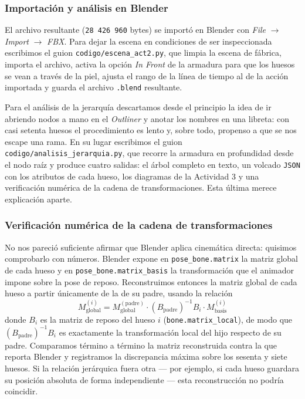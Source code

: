 \subsubsection{Importación y análisis en Blender}
El archivo resultante (\texttt{28\,426\,960} bytes) se importó en Blender con \textit{File} $\to$ \textit{Import} $\to$ \textit{FBX}. Para dejar la escena en condiciones de ser inspeccionada escribimos el guion \texttt{codigo/escena\_act2.py}, que limpia la escena de fábrica, importa el archivo, activa la opción \textit{In Front} de la armadura para que los huesos se vean a través de la piel, ajusta el rango de la línea de tiempo al de la acción importada y guarda el archivo \texttt{.blend} resultante.

Para el análisis de la jerarquía descartamos desde el principio la idea de ir abriendo nodos a mano en el \textit{Outliner} y anotar los nombres en una libreta: con casi setenta huesos el procedimiento es lento y, sobre todo, propenso a que se nos escape una rama. En su lugar escribimos el guion \texttt{codigo/analisis\_jerarquia.py}, que recorre la armadura en profundidad desde el nodo raíz y produce cuatro salidas: el árbol completo en texto, un volcado \texttt{JSON} con los atributos de cada hueso, los diagramas de la Actividad 3 y una verificación numérica de la cadena de transformaciones. Esta última merece explicación aparte.

\subsubsection{Verificación numérica de la cadena de transformaciones}
No nos pareció suficiente afirmar que Blender aplica cinemática directa: quisimos comprobarlo con números. Blender expone en \texttt{pose\_bone.matrix} la matriz global de cada hueso y en \texttt{pose\_bone.matrix\_basis} la transformación que el animador impone sobre la pose de reposo. Reconstruimos entonces la matriz global de cada hueso a partir únicamente de la de su padre, usando la relación
\begin{equation}
    M_{\text{global}}^{(i)} = M_{\text{global}}^{(\text{padre})} \cdot
    \left(B_{\text{padre}}\right)^{-1} B_i \cdot M_{\text{basis}}^{(i)}
    \label{eq:reconstruccion}
\end{equation}
donde $B_i$ es la matriz de reposo del hueso $i$ (\texttt{bone.matrix\_local}), de modo que $\left(B_{\text{padre}}\right)^{-1} B_i$ es exactamente la transformación local del hijo respecto de su padre. Comparamos término a término la matriz reconstruida contra la que reporta Blender y registramos la discrepancia máxima sobre los sesenta y siete huesos. Si la relación jerárquica fuera otra --- por ejemplo, si cada hueso guardara su posición absoluta de forma independiente --- esta reconstrucción no podría coincidir.


